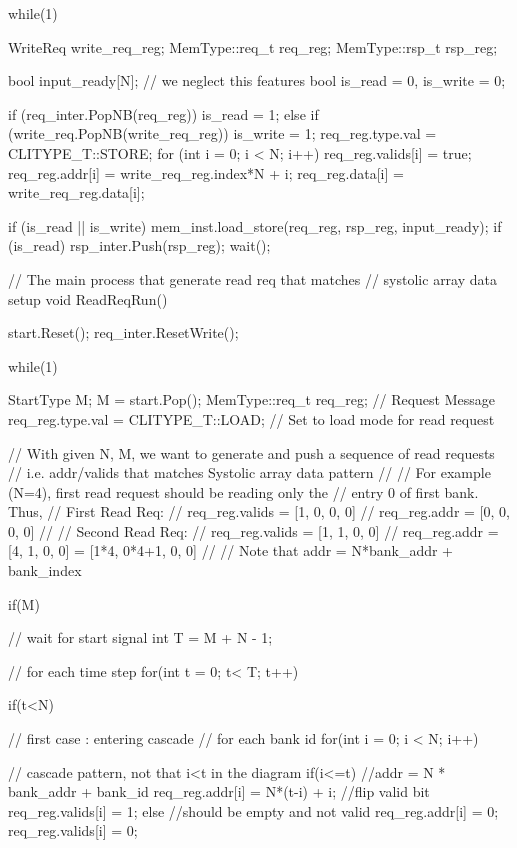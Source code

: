 \begin{codeblock}[language=c++]
{{    while(1) {
      WriteReq write_req_reg;
      MemType::req_t req_reg;
      MemType::rsp_t rsp_reg;

      bool input_ready[N];   // we neglect this features
      bool is_read = 0, is_write = 0;
     
      if (req_inter.PopNB(req_reg)) {
        is_read = 1;
      }
      else if (write_req.PopNB(write_req_reg)) {
        is_write = 1;
        req_reg.type.val = CLITYPE_T::STORE;
        for (int i = 0; i < N; i++) {
          req_reg.valids[i] = true;
          req_reg.addr[i] = write_req_reg.index*N + i;
          req_reg.data[i] = write_req_reg.data[i];
        }
      }

      if (is_read || is_write) {
        mem_inst.load_store(req_reg, rsp_reg, input_ready);
      }
      if (is_read) {
        rsp_inter.Push(rsp_reg);
      }
      wait();
    }
  }
  
  // The main process that generate read req that matches
  //   systolic array data setup
  void ReadReqRun() {
    start.Reset();
    req_inter.ResetWrite();   

    while(1) {
      StartType M;
      M = start.Pop();
      MemType::req_t req_reg;              // Request Message 
      req_reg.type.val = CLITYPE_T::LOAD;  // Set to load mode for read request

      // With given N, M, we want to generate and push a sequence of read requests
      //   i.e. addr/valids that matches Systolic array data pattern
      // 
      // For example (N=4), first read request should be reading only the 
      // entry 0 of first bank. Thus,
      // First Read Req: 
      //   req\_reg.valids = [1, 0, 0, 0]
      //   req\_reg.addr   = [0, 0, 0, 0]
      //  
      // Second Read Req:
      //   req\_reg.valids = [1, 1, 0, 0]
      //   req\_reg.addr   = [4, 1, 0, 0] = [1*4, 0*4+1, 0, 0]
      // 
      // Note that addr = N*bank\_addr + bank\_index
      
      if(M) { // wait for start signal
        int T = M + N - 1;

        // for each time step
        for(int t = 0; t< T; t++){
          if(t<N){ // first case : entering cascade
            // for each bank id
            for(int i = 0; i < N; i++){
          
              // cascade pattern, not that i<t in the diagram
              if(i<=t){
                //addr = N * bank\_addr + bank\_id
                req_reg.addr[i] = N*(t-i) + i;
                //flip valid bit
                req_reg.valids[i] = 1;
              }else{
                //should be empty and not valid
                req_reg.addr[i] = 0;
                req_reg.valids[i] = 0;
              }
            }
          }
          
}}}}}
\end{codeblock}
